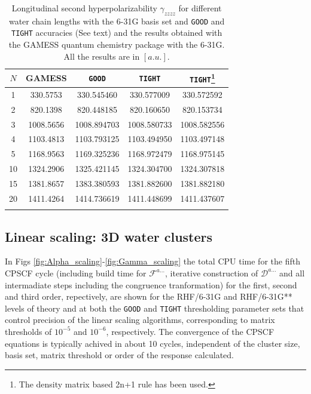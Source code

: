 \documentclass[prl,aps,twocolumn,showpacs,twocolumngrid,superbib]{revtex4}
\def\F{\mathcal{F}}
\def\D{\mathcal{D}}
\begin{document}
\begin{table}
  \centering
  \caption{\protect
    Longitudinal second hyperpolarizability $\gamma_{zzzz}$
    for different water chain lengths with the 6-31G basis set
    and {\tt GOOD} and {\tt TIGHT} accuracies (See text) and the results obtained with
    the GAMESS quantum chemistry package \cite{gamess} with the 6-31G. 
    All the results are in $[a.u.]$.
  }\label{tab:Gamma_1D_Values}
  \begin{tabular}{ccccc}
    \toprule
    $N$ &\multicolumn{1}{c}{{\sc GAMESS}}
    &\multicolumn{1}{c}{{\tt GOOD}}
    &\multicolumn{1}{c}{{\tt TIGHT}}
    &\multicolumn{1}{c}{{\tt TIGHT}\footnote[1]{The density matrix based 2n+1 rule has been used.}} \\
    \hline
     1 &  330.5753 &  330.545460 &  330.577009 &  330.572592 \\
     2 &  820.1398 &  820.448185 &  820.160650 &  820.153734 \\
     3 & 1008.5656 & 1008.894703 & 1008.580733 & 1008.582556 \\
     4 & 1103.4813 & 1103.793125 & 1103.494950 & 1103.497148 \\
     5 & 1168.9563 & 1169.325236 & 1168.972479 & 1168.975145 \\
    10 & 1324.2906 & 1325.421145 & 1324.304700 & 1324.307818 \\
    15 & 1381.8657 & 1383.380593 & 1381.882600 & 1381.882180 \\
    20 & 1411.4264 & 1414.736619 & 1411.448699 & 1411.437607 \\
    \botrule
  \end{tabular}
\end{table}

\subsection{Linear scaling: 3D water clusters}

In Figs \ref{fig:Alpha_scaling}-\ref{fig:Gamma_scaling} the total CPU time for 
the fifth CPSCF cycle (including build time
for $\F^{a\ldots}$, iterative construction of $\D^{a\ldots}$ and all intermadiate
steps including the congruence tranformation) for the first, second and third
order, repectively, are shown for the RHF/6-31G and RHF/6-31G** levels of
theory and at both the {\tt GOOD} and {\tt TIGHT} thresholding parameter 
sets that control precision of the linear scaling algorithms, corresponding 
to matrix thresholds of $10^{-5}$ and $10^{-6}$, respectively. The convergence
of the CPSCF equations is typically achived in about 10 cycles, independent of the
cluster size, basis set, matrix threshold or order of the response calculated.
\end{document}
